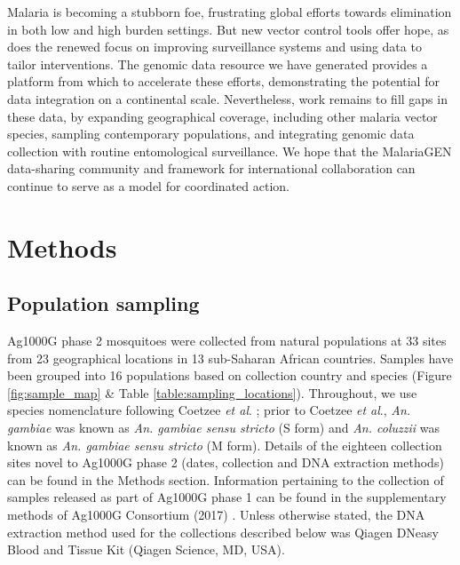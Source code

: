 \documentclass[a4paper,11pt,abstracton,hidelinks]{scrartcl}
\begin{document}
Malaria is becoming a stubborn foe, frustrating global efforts towards elimination in both low and high burden settings.
%
But new vector control tools offer hope, as does the renewed focus on improving surveillance systems and using data to tailor interventions.
%
The genomic data resource we have generated provides a platform from which to accelerate these efforts, demonstrating the potential for data integration on a continental scale.
%
Nevertheless, work remains to fill gaps in these data, by expanding geographical coverage, including other malaria vector species, sampling contemporary populations, and integrating genomic data collection with routine entomological surveillance.
%
We hope that the MalariaGEN data-sharing community and framework for international collaboration can continue to serve as a model for coordinated action.  


\section*{Methods}


\subsection*{Population sampling}

%
Ag1000G phase 2 mosquitoes were collected from natural populations at 33 sites from 23
geographical locations in 13 sub-Saharan African countries. 
%
Samples have been grouped into 16 populations based on collection country and species (Figure \ref{fig:sample_map} \& Table \ref{table:sampling_locations}).
%
Throughout, we use species nomenclature following Coetzee \textit{et al}. \cite{coetzee2013};	
%
prior to	 Coetzee	 \textit{et al}., \textit{An. gambiae} was known as \textit{An. gambiae sensu stricto} (S form) and \textit{An. coluzzii} was known as \textit{An. gambiae sensu stricto} (M form).
%
Details of the eighteen collection sites novel to Ag1000G phase 2 (dates, collection and DNA extraction methods) can be found in the Methods section.
%
Information pertaining to the collection of samples released as part of Ag1000G phase 1 can be found in the supplementary methods of Ag1000G Consortium (2017) \cite{Ag1000G2017}.
%
Unless otherwise stated, the DNA extraction method used for the collections described below was Qiagen DNeasy Blood and Tissue Kit (Qiagen Science, MD, USA).
\end{document}
